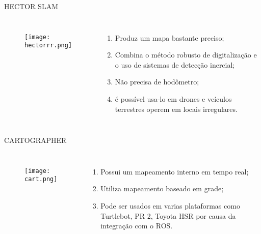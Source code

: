 \begin{frame}[c]{HECTOR SLAM}
    \transboxout[duration=0.5]
    \begin{columns}
            \begin{figure}
            \texttt{[image: hectorrr.png]}
            \caption{\cite{HectorSL95}}
            \end{figure}
            \begin{enumerate}
                \item Produz um mapa bastante preciso;
                \item Combina o método robusto de digitalização e o uso de sistemas de detecção inercial;
                \item Não precisa de hodômetro;  
                \item é possível usa-lo em drones e veículos terrestres operem em locais irregulares. 
            \end{enumerate}
    \end{columns}


\end{frame}
\begin{frame}[c]{CARTOGRAPHER}
    \transboxout[duration=0.5]
    \begin{columns}
            \begin{figure}
            \texttt{[image: cart.png]}
            \caption{\cite{Cartogra48}}
            \end{figure}
            \begin{enumerate}
                \item Possui um mapeamento interno em tempo real;
                \item Utiliza mapeamento baseado em grade; 
                \item Pode ser usados em varias plataformas como Turtlebot, PR 2, Toyota HSR por causa da integração com o ROS. 
            \end{enumerate}
    \end{columns}

\end{frame}
